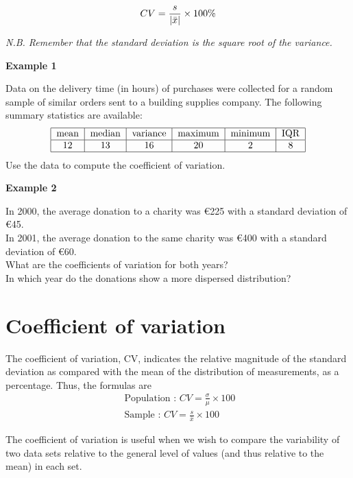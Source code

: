 \documentclass[]{report}
\begin{document}
\[
CV = {s \over |\bar{x}|} \times 100\%
\]

\bigskip
\textit{N.B. Remember that the standard deviation is the square root of the variance.}

\noindent \textbf{Example 1}

Data on the delivery time (in hours) of purchases were collected for a random sample of similar orders sent to a building supplies company. The following summary statistics are available:
\[
\begin{tabular}{|c|c|c|c|c|c|}
\hline
mean & median & variance  & maximum & minimum & IQR \\ \hline
12 & 13 & 16 & 20 & 2 & 8\\
\hline
\end{tabular}
\]
Use the data to compute the coefficient of variation.

\noindent \textbf{Example 2}

In 2000, the average donation to a charity was \euro 225 with a standard deviation of \euro 45.\\
In 2001, the average donation to the same charity was \euro400 with a standard deviation of \euro 60.\\
\bigskip
What are the coefficients of variation for both years?\\
\vspace{2.5cm}
In which year do the donations show a more dispersed distribution?\\


	\section{Coefficient of variation}
	
	The coefficient of variation, CV, indicates the relative magnitude of the standard deviation as compared
	with the mean of the distribution of measurements, as a percentage. Thus, the formulas are
	\begin{eqnarray*}
		\mbox{ Population : } CV = \frac{\sigma}{\mu } \times 100 \\
		\mbox{ Sample : } CV = \frac{s}{\bar{x}} \times 100
	\end{eqnarray*}
	
	The coefficient of variation is useful when we wish to compare the variability of two data sets relative to the
	general level of values (and thus relative to the mean) in each set.
	
\end{document}
